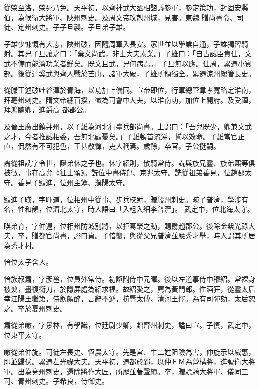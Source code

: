 \begin{pinyinscope}
 從榮至洛，榮死乃免。天平初，以齊神武大丞相諮議參軍，參定策功，封固安縣伯，為候衛大將軍、陜州刺史。及周文帝攻剋州城，見害。東魏
 贈尚書令、司徒、定州刺史。子子旦襲。子旦弟子雄。



 子雄少慷慨有大志，陜州破，因隨周軍入長安。家世並以學業自通，子雄獨習騎射。其兄子旦讓之曰：「棄文尚武，非士大夫素業。」子雄曰：「自古誠臣貴仕，文武不備而能濟功業者鮮矣。既文且武，兄何病焉。」子旦無以應。仕周，累遷小賓部。後從達奚武與齊人戰於芒山，諸軍大破，子雄所領獨全。累遷涼州總管長史。



 從滕王逌破吐谷渾於青海，以功加上儀同。宣帝即位，行軍總管韋孝寬略定淮南，拜亳州刺史。隋文帝總百揆，徵為司會中大夫，以淮南功，加位上開府。及受禪，拜鴻臚卿，進爵高
 都郡公。



 及晉王廣出鎮并州，以子雄為河北行臺兵部尚書。上謂曰：「吾兒既少，卿兼文武之才，今者推誠相委，吾無北顧憂矣。」子雄頓首流涕，誓以效命。子雄當官正直，侃然有不可犯色，王甚敬憚，吏人稱焉。歲餘，卒官。子公挺嗣。



 裔從祖詵字令世，誕弟休之子也。休字紹則，散騎常侍。詵與族兄靈、族弟熙等俱被徵，事在高允《征士頌》。詵位中書侍郎、京兆太守。詵從祖弟善見，位趙郡太守。善見子顯進，位州主簿、濮陽太守。



 顯進子暎，字暉道，位相州中從事、步兵校尉，贈殷州刺史。暎子普濟，學涉有名，性和韻，位濟北太守，時人語曰「入粗入細李普濟」。
 武定中，位北海太守。



 暎弟育，字仲遠，位相州防城別將，以拒葛榮之勳，賜爵趙郡公。後除金紫光祿大夫，卒，贈都官尚書，謚曰貞。子愔襲，與從父兄普濟並應秀才舉，時人謂其所居為秀才村。



 愔位太子舍人。



 愔族叔肅，字彥邕，位員外常侍。初諂附侍中元暉。後以左道事侍中穆紹。常裸身被髮，畫復銜刀，於隱屏處為紹求福。故紹愛之，薦為黃門郎。性酒狂，從靈太后幸江陽王繼第，侍飲頗醉，言辭不遜，抗辱太傅、清河王懌。為有司彈劾，太后恕之。卒於夏州刺史。



 肅從弟皦，字景林，有學識，位廷尉少卿，贈齊州刺史，謚曰宣。子慎，武定中，位東平太守。



 皦從弟仲旋。司徒左長史、恆農太守。先是宮、牛二姓阻險為害，仲旋示以威惠，即並歸伏。累遷左光祿大夫。天平初，遷都於鄴，以仲ＦＭ為營構將，進號衛大將軍。出為兗州刺史，還除將作大匠，所歷並著聲績。卒，贈驃騎大將軍、儀同三司、青州刺史。子希良，侍御史。




\end{pinyinscope}

